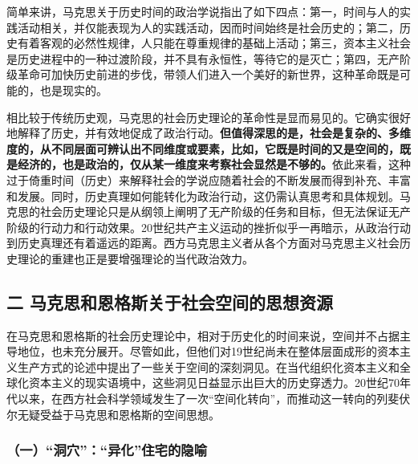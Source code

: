 \documentclass[UTF8, fontset = sourcesans, a4paper, oneside, zihao =
-4, scheme=chinese, no-math, space=true]{ctexbook}
\begin{document}
简单来讲，马克思关于历史时间的政治学说指出了如下四点：第一，时间与人的实践活动相关，并仅能表现为人的实践活动，因而时间始终是社会历史的；第二，历史有着客观的必然性规律，人只能在尊重规律的基础上活动；第三，资本主义社会是历史进程中的一种过渡阶段，并不具有永恒性，等待它的是灭亡；第四，无产阶级革命可加快历史前进的步伐，带领人们进入一个美好的新世界，这种革命既是可能的，也是现实的。

相比较于传统历史观，马克思的社会历史理论的革命性是显而易见的。它确实很好地解释了历史，并有效地促成了政治行动。\textbf{但值得深思的是，社会是复杂的、多维度的，从不同层面可辨认出不同维度或要素，比如，它既是时间的又是空间的，既是经济的，也是政治的，仅从某一维度来考察社会显然是不够的。}依此来看，这种过于倚重时间（历史）来解释社会的学说应随着社会的不断发展而得到补充、丰富和发展。同时，历史真理如何能转化为政治行动，这仍需认真思考和具体规划。马克思的社会历史理论只是从纲领上阐明了无产阶级的任务和目标，但无法保证无产阶级的行动力和行动效果。20世纪共产主义运动的挫折似乎一再暗示，从政治行动到历史真理还有着遥远的距离。西方马克思主义者从各个方面对马克思主义社会历史理论的重建也正是要增强理论的当代政治效力。

\subsection{二
马克思和恩格斯关于社会空间的思想资源}\label{part0010_split_002.htmlux5cux23c059}

在马克思和恩格斯的社会历史理论中，相对于历史化的时间来说，空间并不占据主导地位，也未充分展开。尽管如此，但他们对19世纪尚未在整体层面成形的资本主义生产方式的论述中提出了一些关于空间的深刻洞见。在当代组织化资本主义和全球化资本主义的现实语境中，这些洞见日益显示出巨大的历史穿透力。20世纪70年代以来，在西方社会科学领域发生了一次``空间化转向''，而推动这一转向的列斐伏尔无疑受益于马克思和恩格斯的空间思想。

\subsubsection{\texorpdfstring{（一）``洞穴''：``异化''住宅的隐喻}{（一）洞穴：异化住宅的隐喻}}\label{part0010_split_002.htmlux5cux23d035}
\end{document}
